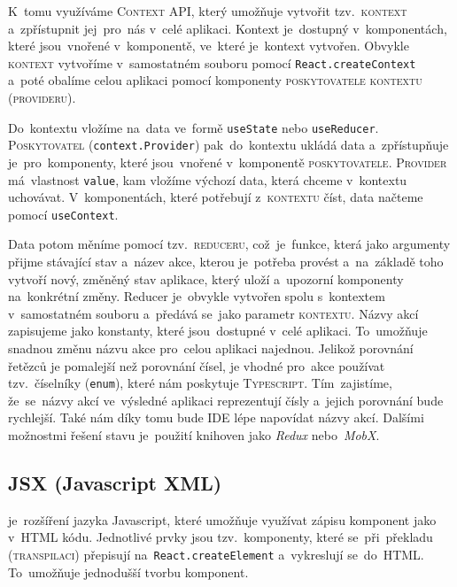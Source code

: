 \documentclass[14pt,a4paper]{article}
\begin{document}
        K~tomu využíváme \textsc{Context API}, který umožňuje vytvořit tzv.~\textsc{kontext} a~zpřístupnit jej~pro~nás v~celé aplikaci. Kontext je~dostupný v~komponentách, které jsou~vnořené v~komponentě, ve~které je~kontext vytvořen. Obvykle \textsc{kontext} vytvoříme v~samostatném souboru pomocí \texttt{React.createContext} a~poté obalíme celou aplikaci pomocí komponenty \textsc{poskytovatele kontextu} (\textsc{provideru}).
        
        Do~kontextu vložíme  na~data ve~formě \texttt{useState} nebo \texttt{useReducer}. \textsc{Poskytovatel} (\texttt{context.Provider}) pak~do~kontextu ukládá data a~zpřístupňuje je~pro~komponenty, které jsou~vnořené v~komponentě \textsc{poskytovatele}. \cite{hswolff:reactContextReducer}
        \textsc{Provider} má~vlastnost \texttt{value}, kam vložíme výchozí data, která chceme v~kontextu uchovávat. V~komponentách, které potřebují z~\textsc{kontextu} číst, data načteme pomocí \texttt{useContext}.
        
        Data potom měníme pomocí tzv.~\textsc{reduceru}, což~je~funkce, která jako argumenty přijme stávající stav a~název akce, kterou je~potřeba provést a~na~základě toho vytvoří nový, změněný stav aplikace, který uloží a~upozorní komponenty na~konkrétní změny. Reducer je~obvykle vytvořen spolu s~kontextem v~samostatném souboru a~předává se~jako parametr \textsc{kontextu}. Názvy akcí zapisujeme jako konstanty, které jsou~dostupné v~celé aplikaci. To~umožňuje snadnou změnu názvu akce pro~celou aplikaci najednou. Jelikož porovnání řetězců je pomalejší než porovnání čísel, je vhodné pro~akce používat tzv.~číselníky (\texttt{enum}), které nám poskytuje \textsc{Typescript}. Tím~zajistíme, že~se~názvy akcí ve~výsledné aplikaci reprezentují čísly a~jejich porovnání bude rychlejší. Také nám díky tomu bude \textsc{IDE} lépe napovídat názvy akcí. Dalšími možnostmi řešení stavu je~použití knihoven jako \emph{Redux} nebo~\emph{MobX}.

        \subsection{JSX (Javascript XML)} je~rozšíření jazyka Javascript, které umožňuje využívat zápisu komponent jako v~HTML kódu. Jednotlivé prvky jsou tzv.~komponenty, které se~při~překladu (\textsc{transpilaci}) přepisují na~\texttt{React.createElement} a~vykreslují se~do~HTML. To~umožňuje jednodušší tvorbu komponent. \cite{reactJSX}
        
\end{document}
